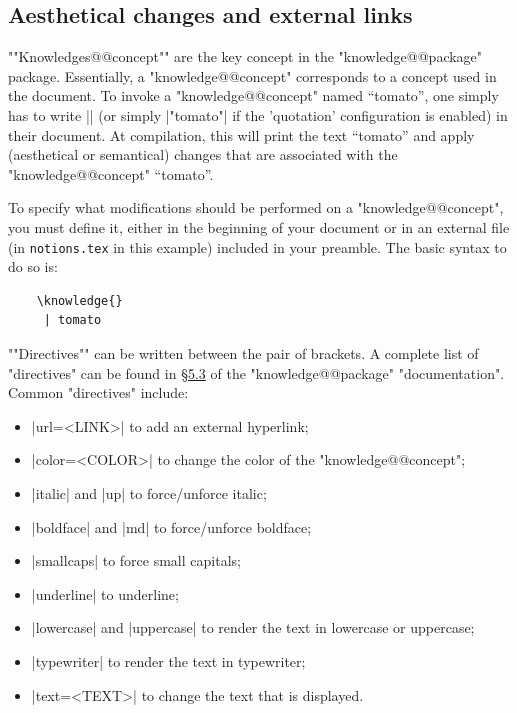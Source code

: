 \documentclass{article}
\begin{document}
\subsection{Aesthetical changes and external links}

\AP""Knowledges@@concept"" are the key concept in the "knowledge@@package" 
package. Essentially, a "knowledge@@concept" corresponds to a concept used in 
the document. To invoke a "knowledge@@concept" named ``tomato'', one simply has 
to write \spverb|| (or simply
%
\spverb|"tomato"|%
if the 'quotation' 
configuration is enabled) in their document. At compilation, this will 
print the text ``tomato'' and apply (aesthetical or semantical) changes that
are associated with the "knowledge@@concept" ``tomato''.

To specify what modifications should be performed on a "knowledge@@concept", 
you must define it, either in the beginning of your document or in an external file (in \texttt{notions.tex} in this example) included in your preamble.
The basic syntax to do so is:
\begin{verbatim}
    \knowledge{}
     | tomato
\end{verbatim}
\AP""Directives"" can be written between the pair of brackets. A complete list of "directives" can be found in \href{https://texlive.mycozy.space/macros/latex/contrib/knowledge/knowledge.pdf#subsection.5.3}{§5.3} of the "knowledge@@package" "documentation". Common "directives" include:
\begin{itemize}
    \item \spverb|url=<LINK>| to add an external hyperlink;
    \item \spverb|color=<COLOR>| to change the color of the "knowledge@@concept";
    \item \spverb|italic| and \spverb|up| to force/unforce italic;
    \item \spverb|boldface| and \spverb|md| to force/unforce boldface;
    \item \spverb|smallcaps| to force small capitals;
    \item \spverb|underline| to underline;
    \item \spverb|lowercase| and \spverb|uppercase| to render the text in lowercase or uppercase;
    \item \spverb|typewriter| to render the text in typewriter;
    \item \spverb|text=<TEXT>| to change the text that is displayed.
\end{itemize}
\end{document}
